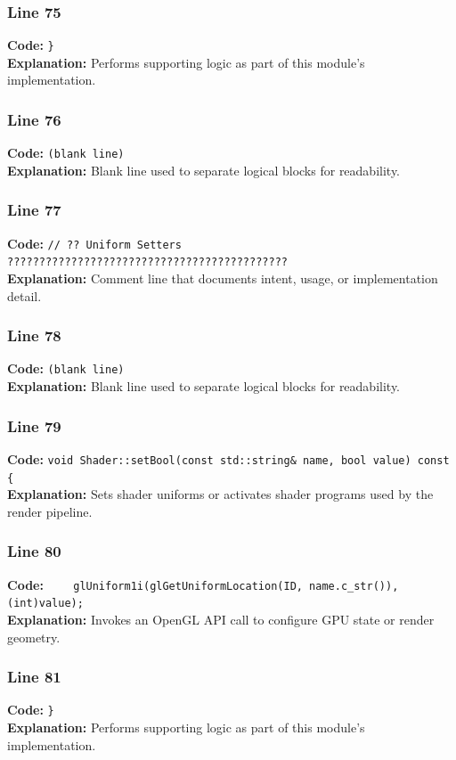 \documentclass[11pt,a4paper]{article}
\begin{document}
\subsubsection*{Line 75}
\textbf{Code:} \verb|}|\\
\textbf{Explanation:} Performs supporting logic as part of this module's implementation.

\subsubsection*{Line 76}
\textbf{Code:} \texttt{(blank line)}\\
\textbf{Explanation:} Blank line used to separate logical blocks for readability.

\subsubsection*{Line 77}
\textbf{Code:} \verb|// ?? Uniform Setters ????????????????????????????????????????????|\\
\textbf{Explanation:} Comment line that documents intent, usage, or implementation detail.

\subsubsection*{Line 78}
\textbf{Code:} \texttt{(blank line)}\\
\textbf{Explanation:} Blank line used to separate logical blocks for readability.

\subsubsection*{Line 79}
\textbf{Code:} \verb|void Shader::setBool(const std::string& name, bool value) const {|\\
\textbf{Explanation:} Sets shader uniforms or activates shader programs used by the render pipeline.

\subsubsection*{Line 80}
\textbf{Code:} \verb|    glUniform1i(glGetUniformLocation(ID, name.c_str()), (int)value);|\\
\textbf{Explanation:} Invokes an OpenGL API call to configure GPU state or render geometry.

\subsubsection*{Line 81}
\textbf{Code:} \verb|}|\\
\textbf{Explanation:} Performs supporting logic as part of this module's implementation.
\end{document}
